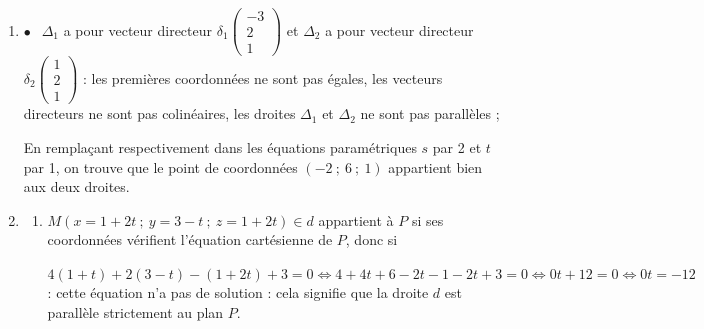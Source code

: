 \begin{enumerate}
\item 
















$\bullet~~$ $\Delta_1$ a pour vecteur directeur $\delta_1\begin{pmatrix}-3\\2\\1\end{pmatrix}$ et $\Delta_2$ a pour vecteur directeur $\delta_2\begin{pmatrix}1\\2\\1\end{pmatrix}$ : les premières coordonnées ne sont pas égales, les vecteurs directeurs ne sont pas colinéaires, les droites $\Delta_1$ et $\Delta_2$ ne sont pas parallèles ; 





































En remplaçant respectivement dans les équations paramétriques $s$ par 2 et $t$ par 1, on trouve que le point de coordonnées $(-2~;~6~;~1)$ appartient bien aux deux droites.
\item 





	\begin{enumerate}
		\item 
$M(x = 1 + 2t~;~y = 3 - t~;~z = 1 + 2t) \in d$ appartient à $P$ si ses coordonnées vérifient l'équation cartésienne de $P$, donc si 

$4(1 + t) + 2(3 - t) -(1 + 2t) + 3 = 0 \iff 4 + 4t + 6 - 2t - 1 - 2t + 3 = 0 \iff 0t + 12 = 0 \iff 0t = -12$ : cette équation n'a pas de solution : cela signifie que la droite $d$ est parallèle strictement au plan $P$.





\end{enumerate}
\end{enumerate}
